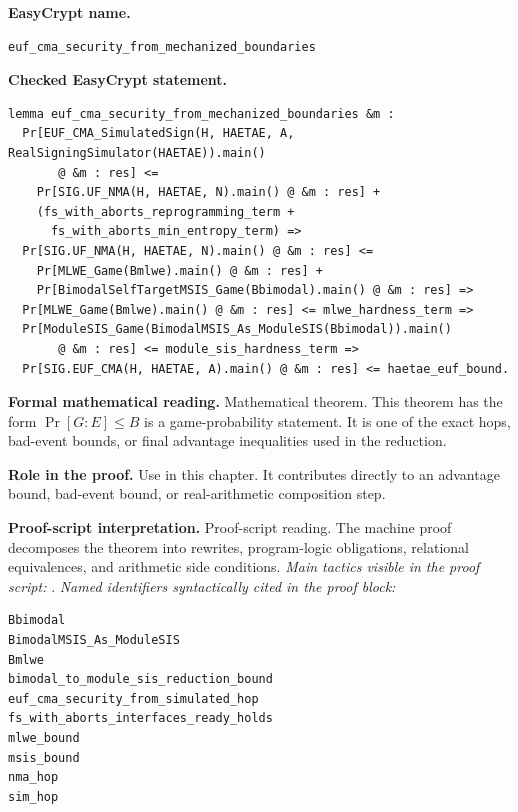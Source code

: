 \begin{formaltheorem}
\noindent\textbf{EasyCrypt name.}
\begin{lstlisting}[language=EasyCrypt,basicstyle=\ttfamily\scriptsize]
euf_cma_security_from_mechanized_boundaries
\end{lstlisting}
\noindent\textbf{Checked EasyCrypt statement.}
\begin{lstlisting}[language=EasyCrypt,basicstyle=\ttfamily\scriptsize]
lemma euf_cma_security_from_mechanized_boundaries &m :
  Pr[EUF_CMA_SimulatedSign(H, HAETAE, A, RealSigningSimulator(HAETAE)).main()
       @ &m : res] <=
    Pr[SIG.UF_NMA(H, HAETAE, N).main() @ &m : res] +
    (fs_with_aborts_reprogramming_term +
      fs_with_aborts_min_entropy_term) =>
  Pr[SIG.UF_NMA(H, HAETAE, N).main() @ &m : res] <=
    Pr[MLWE_Game(Bmlwe).main() @ &m : res] +
    Pr[BimodalSelfTargetMSIS_Game(Bbimodal).main() @ &m : res] =>
  Pr[MLWE_Game(Bmlwe).main() @ &m : res] <= mlwe_hardness_term =>
  Pr[ModuleSIS_Game(BimodalMSIS_As_ModuleSIS(Bbimodal)).main()
       @ &m : res] <= module_sis_hardness_term =>
  Pr[SIG.EUF_CMA(H, HAETAE, A).main() @ &m : res] <= haetae_euf_bound.
\end{lstlisting}
\noindent\textbf{Formal mathematical reading.}
Mathematical theorem. This theorem has the form \(\Pr[G:E] \le B\) is a game-probability statement.  It is one of the exact hops, bad-event bounds, or final advantage inequalities used in the reduction.

\noindent\textbf{Role in the proof.}
Use in this chapter. It contributes directly to an advantage bound, bad-event bound, or real-arithmetic composition step.

\noindent\textbf{Proof-script interpretation.}
Proof-script reading. The machine proof decomposes the theorem into rewrites, program-logic obligations, relational equivalences, and arithmetic side conditions.
\emph{Main tactics visible in the proof script:} .
\emph{Named identifiers syntactically cited in the proof block:}
\begin{lstlisting}[language=EasyCrypt,basicstyle=\ttfamily\scriptsize]
Bbimodal
BimodalMSIS_As_ModuleSIS
Bmlwe
bimodal_to_module_sis_reduction_bound
euf_cma_security_from_simulated_hop
fs_with_aborts_interfaces_ready_holds
mlwe_bound
msis_bound
nma_hop
sim_hop
\end{lstlisting}

\end{formaltheorem}

